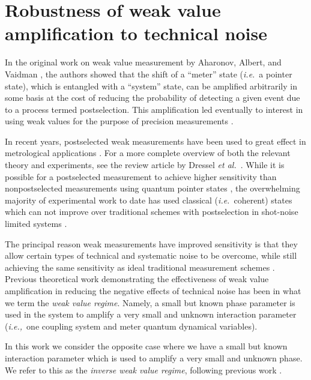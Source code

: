 \chapter{Robustness of weak value amplification to technical noise}
In the original work on weak value measurement by Aharonov, Albert, and Vaidman \cite{Aharonov1988}, the authors showed that the shift of a ``meter'' state (\emph{i.e.}~a pointer state), which is entangled with a ``system'' state, can be amplified arbitrarily in some basis at the cost of reducing the probability of detecting a given event due to a process termed postselection.  This amplification led eventually to interest in using weak values for the purpose of precision measurements \cite{Hosten2008,Dixon2009}. 
 
In recent years, postselected weak measurements have been used to great effect in metrological applications \cite{Dixon2009,Starling2009,Starling2010,Starling2010a,Howell2010,Hogan:11,Egan:12,Strubi2013,Viza:13,Zhou2012,Zhou2013}.  For a more complete overview of both the relevant theory and experiments, see the review article by Dressel \emph{et al.}~\cite{Dressel2014}.  While it is possible for a postselected measurement to achieve higher sensitivity than nonpostselected measurements using quantum pointer states \cite{Pang2014,Pang2015}, the overwhelming majority of experimental work to date has used classical (\emph{i.e.}~coherent) states which can not improve over traditional schemes with postselection in shot-noise limited systems \cite{Pang2015}.

The principal reason weak measurements have improved sensitivity is that they allow certain types of technical and systematic noise to be overcome, while still achieving the same sensitivity as ideal  traditional measurement schemes \cite{Starling2009,Jordan2014,Knee2014,Pang2016}.  Previous theoretical work demonstrating the effectiveness of weak value amplification in reducing the negative effects of technical noise has been in what we term the \emph{weak value regime}.  Namely, a small but known phase parameter is used in the system to amplify a very small and unknown interaction parameter (\emph{i.e.,}~one coupling system and meter quantum dynamical variables).  

In this work we consider the opposite case where we have a small but known interaction parameter which is used to amplify a very small and unknown phase.  We refer to this as the \emph{inverse weak value regime}, following previous work \cite{Starling2010a,Dressel2013,Lyons2015,Kofman2012}. 

